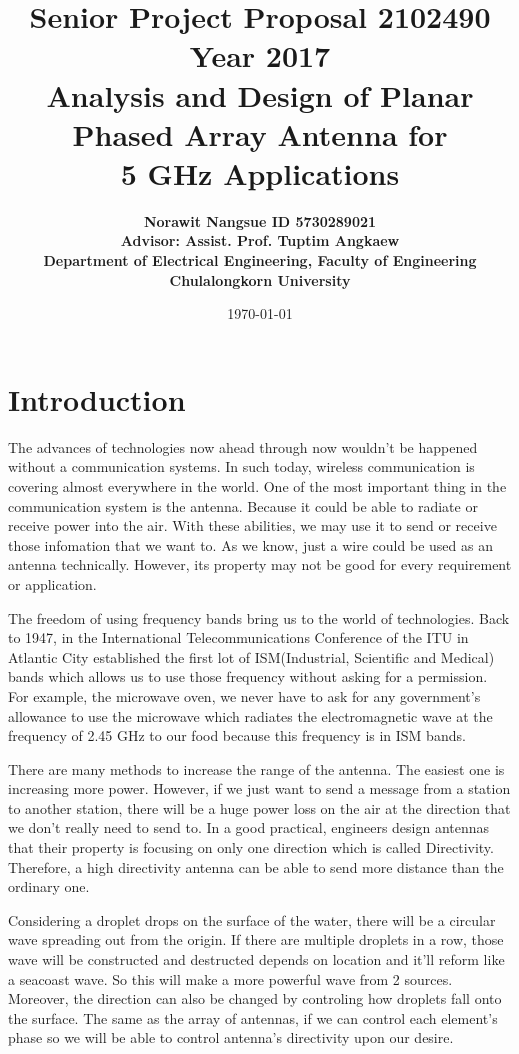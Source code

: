 \documentclass[11pt,a4paper]{article}
\title{
  \textbf{Senior Project Proposal 2102490 Year 2017}  \\[2ex]
  Analysis and Design of Planar Phased Array Antenna for \\[1ex]
  5 GHz Applications
}
\author{\textbf{Norawit Nangsue ID 5730289021} \\[1ex]
\textbf{Advisor: Assist. Prof. Tuptim Angkaew} \\[1ex]
\textbf{Department of Electrical Engineering, Faculty of Engineering} \\[1ex]
\textbf{Chulalongkorn University}
}
\date{\today}
\begin{document}
  \maketitle
  \tableofcontents
  \newpage
  \section{Introduction}
    \indent The advances of technologies now ahead through now wouldn't be happened without a communication systems.
            In such today, wireless communication is covering almost everywhere in the world. One of the most important
            thing in the communication system is the antenna. Because it could be able to radiate or receive power into the air.
            With these abilities, we may use it to send or receive those infomation that we want to. As we know, just a wire
            could be used as an antenna technically. However, its property may not be good for every requirement or application.

    \indent The freedom of using frequency bands bring us to the world of technologies. Back to 1947, in the International Telecommunications
            Conference of the ITU in Atlantic City established the first lot of ISM(Industrial, Scientific and Medical) bands which allows us
            to use those frequency without asking for a permission. For example, the microwave oven, we never have to ask for any government's 
            allowance to use the microwave which radiates the electromagnetic wave at the frequency of 2.45 GHz to our food because this 
            frequency is in ISM bands.

    \indent There are many methods to increase the range of the antenna. The easiest one is increasing more power. However, if we just want
            to send a message from a station to another station, there will be a huge power loss on the air at the direction that we don't
            really need to send to. In a good practical, engineers design antennas that their property is focusing on only one direction which
            is called Directivity. Therefore, a high directivity antenna can be able to send more distance than the ordinary one.

    \indent Considering a droplet drops on the surface of the water, there will be a circular wave spreading out from the origin.
            If there are multiple droplets in a row, those wave will be constructed and destructed depends on location and it'll
            reform like a seacoast wave. So this will make a more powerful wave from 2 sources. Moreover, the direction can also
            be changed by controling how droplets fall onto the surface. The same as the array of antennas, if we can control each
            element's phase so we will be able to control antenna's directivity upon our desire. 
\end{document}
